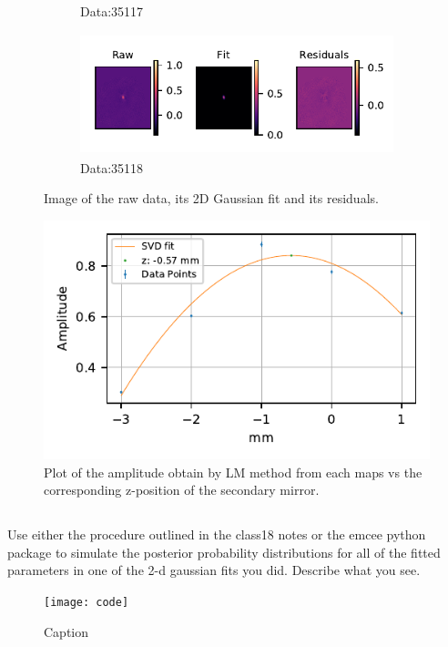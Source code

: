 \begin{figure}
\begin{subfigure}[b]{.45\textwidth}
        \caption{Data:35117}
        \label{fig:lmtFit7}
    \end{subfigure}
    \begin{subfigure}[b]{.45\textwidth}
        \centering
        \includegraphics[height=100pt]{CodeAndFigures/DataFits8.pdf}
        \caption{Data:35118}
        \label{fig:lmtFit8}
    \end{subfigure}
    \caption{Image of the raw data, its 2D Gaussian fit and its residuals.}
    \label{fig:lmtRaw}
\end{figure}


\begin{figure}
    \centering
    \includegraphics{CodeAndFigures/QuadFitPlot.pdf}
    \caption{Plot of the amplitude obtain by LM method from each maps vs the corresponding z-position of the secondary mirror. }
    \label{fig:lmtquadfit}
\end{figure}

\subsection{}


Use either the procedure outlined in the class18 notes or the emcee python package to simulate the posterior probability distributions for all of the fitted parameters in one of the 2-d gaussian fits you did. Describe what you see.

\begin{figure}
    \centering
    \texttt{[image: code]}
    \caption{Caption}
    \label{fig:my_label}
\end{figure}

